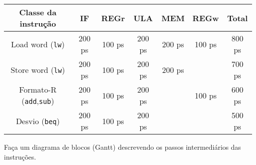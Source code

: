   \begin{tabular}{|c|c|c|c|c|c|c|}\hline
    \bf Classe da instrução & \bf IF & \bf REGr & \bf ULA & \bf MEM &
    \bf REGw & \bf Total
    \\\hline\hline
    Load word ({\tt lw}) & 200 ps & 100 ps & 200 ps & 200 ps & 100 ps
    & 800 ps \\\hline
    Store word ({\tt lw}) & 200 ps & 100 ps & 200 ps & 200 ps & 
    & 700 ps \\\hline
    Formato-R ({\tt add},{\tt sub}) & 200 ps & 100 ps & 200 ps &  & 100 ps
    & 600 ps \\\hline
    Desvio ({\tt beq}) & 200 ps & 100 ps & 200 ps &  & 
    & 500 ps \\\hline
  \end{tabular}

\bigskip
\noindent Faça um diagrama de blocos (Gantt) descrevendo os passos intermediários das
instruções.

\vfill 


